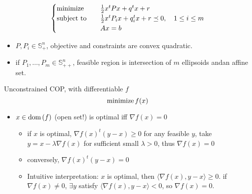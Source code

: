 \begin{remark}
\begin{itemize}
            \[\begin{cases}
                \operatorname{minimize} \quad &\frac{1}{2}x^tPx + q^tx + r\\
                \operatorname{subject\ to} \quad &\frac{1}{2}x^tP_ix + q_i^tx + r \preceq 0,\quad 1 \le i \le m\\
                &Ax = b
            \end{cases}\]
            \begin{itemize}
                \item $P, P_i \in \mathbb{S}_+^n$, objective and constraints are convex quadratic.
                \item if $P_1, \dots, P_m \in \mathbb{S}_{++}^n$, feasible region is intersection of $m$ ellipsoids andan affine set.
            \end{itemize}
    \end{itemize}
\end{remark}

\begin{remark}
    Unconstrained COP, with differentiable $f$ \[\operatorname{minimize}{f(x)}\]
    \begin{itemize}
        \item $x \in \operatorname{dom}{(f)}$ (open set!) is optimal iff $\nabla f(x) = 0$ \begin{itemize}
            \item if $x$ is optimal, $\nabla f(x)^t(y - x) \ge 0$ for any feasible $y$, take $y = x - \lambda \nabla f(x)$ for sufficient small $\lambda > 0$, thus $\nabla f(x) = 0$
            \item conversely, $\nabla f(x)^t(y - x) = 0$
            \item Intuitive interpretation: $x$ is optimal, then $\langle\nabla f(x), y - x\rangle \ge 0$. if $\nabla f(x) \neq 0$, $\exists y$ satisfy $\langle\nabla f(x), y - x\rangle < 0$, so $\nabla f(x) = 0$.
        \end{itemize}
    \end{itemize}
\end{remark}

